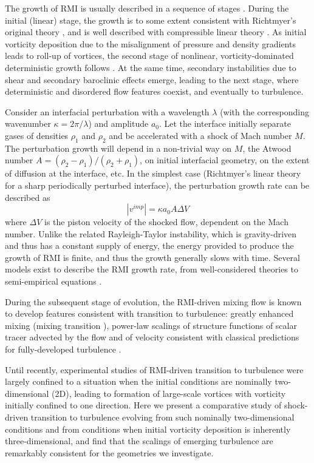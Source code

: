 \documentclass[preprint,superscriptaddress,showpacs]{revtex4-1}
\begin{document}
The growth of RMI is usually described in a sequence of stages \cite{brouillette, kumar}.  During the initial (linear) stage, 
the growth is to some extent consistent with Richtmyer's original theory \cite{richtmyer}, and is well described with compressible
linear theory \cite{yang94}. As initial vorticity deposition due to the misalignment of pressure and density gradients leads to 
roll-up of vortices, the second stage of nonlinear, vorticity-dominated deterministic growth follows \cite{zhangsohn,sadot}. At the same time, secondary instabilities due to shear and secondary baroclinic effects emerge, leading to
the next stage, where deterministic and disordered flow features coexist, and eventually to turbulence. 

Consider an interfacial perturbation with a
wavelength $\lambda$ (with the corresponding wavenumber $\kappa=2\pi / \lambda$) and amplitude $a_0$.
Let the interface initially 
separate gases of densities $\rho_1$ and $\rho_2$ and be accelerated with a shock of Mach number $M$.
The perturbation growth will depend in a non-trivial way on $M$, the Atwood number 
$A=(\rho_2 - \rho_1)/ (\rho_2+ \rho_1)$, on initial interfacial geometry, on the extent of diffusion at the interface, etc. In the simplest case (Richtmyer's linear theory for a sharp periodically perturbed interface), the perturbation growth rate can be described as 
\begin{equation}
\label{richt}
|v^{imp}| = \kappa a_0 A \Delta V
\end{equation}
 where $\Delta V$ is the piston velocity of the shocked flow, dependent on the Mach number. 
Unlike the related Rayleigh-Taylor instability, which is gravity-driven and thus has a constant supply of energy, the energy provided to produce the growth of RMI is finite, 
and thus the growth generally slows with time. Several models exist to describe the RMI growth rate, from well-considered theories \cite{sadot} to semi-empirical equations \cite{rightley99}. 

During the subsequent stage of evolution, the RMI-driven mixing flow is known to 
develop features consistent with transition to turbulence: greatly enhanced mixing 
(mixing transition \cite{rightley99}), power-law scalings of structure functions
of scalar tracer advected by the flow \cite{vorobieff98} and of velocity \cite{mohamed} consistent with classical predictions for fully-developed turbulence \cite{obukhov,corrsin,k41}. 

Until recently, experimental studies of RMI-driven transition to turbulence were largely confined
to a situation when the initial conditions are nominally two-dimensional (2D), leading to formation of large-scale vortices with vorticity initially confined to one direction. Here we present a comparative study of shock-driven transition to turbulence evolving from such nominally 
two-dimensional conditions and from conditions when initial vorticity deposition is inherently 
three-dimensional, and find that the scalings of emerging turbulence are remarkably consistent for 
the geometries we investigate.  
\end{document}
